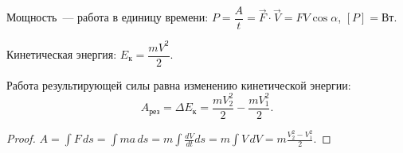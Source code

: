 \documentclass[12pt]{article}
\begin{document}
\begin{definition}
	Мощность~--- работа в единицу времени: $P = \dfrac{A}{t} = \vec{F} \cdot \vec{V} = FV\cos\alpha$, $[P] = \text{Вт}$.
\end{definition}

\begin{definition}
	Кинетическая энергия: $E_{\text{к}} = \dfrac{mV^2}{2}$.
\end{definition}

\begin{theorem}
	Работа результирующей силы равна изменению кинетической энергии:
	\[
		A_{\text{рез}} = \Delta E_{\text{к}} = \frac{mV_2^2}{2} - \frac{mV_1^2}{2}.
	\]
\end{theorem}
\begin{proof}
	$A = \int F\,ds = \int ma\,ds = m\int \frac{dV}{dt}ds = m\int V\,dV = m\frac{V_2^2 - V_1^2}{2}$.
\end{proof}
\end{document}
